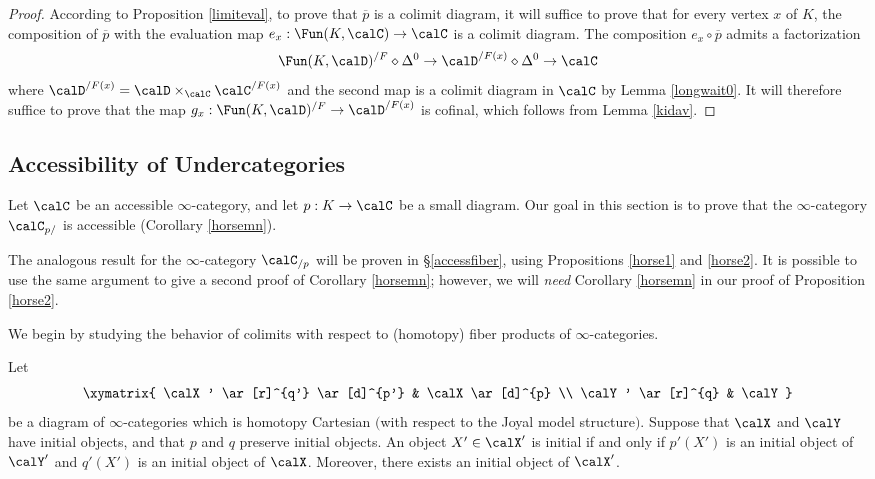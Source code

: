 \begin{proof}
According to Proposition \ref{limiteval}, to prove that $\overline{p}$ is a colimit diagram, it will suffice to prove that for every vertex $x$ of $K$, the composition of $\overline{p}$ with the evaluation
map $e_{x}: \Fun(K,\calC) \rightarrow \calC$ is a colimit diagram. The composition
$e_{x} \circ \overline{p}$ admits a factorization
$$ \Fun(K,\calD)^{/F} \diamond \Delta^0 \rightarrow \calD^{/F(x)} \diamond \Delta^0
\rightarrow \calC$$
where $\calD^{/F(x)} = \calD \times_{\calC} \calC^{/F(x)}$ and the second map is a colimit diagram in $\calC$ by Lemma \ref{longwait0}. It will therefore suffice to prove that the map
$g_x: \Fun(K,\calD)^{/F} \rightarrow \calD^{/F(x)}$ is cofinal, which follows from Lemma \ref{kidav}.
\end{proof}

\subsection{Accessibility of Undercategories}\label{accessprime}

Let $\calC$ be an accessible $\infty$-category, and let $p: K \rightarrow \calC$ be a small diagram. Our goal in this section is to prove that the $\infty$-category $\calC_{p/}$ is accessible (Corollary \ref{horsemn}). 

\begin{remark}
The analogous result for the $\infty$-category $\calC_{/p}$ will be proven in \S \ref{accessfiber}, using Propositions \ref{horse1} and \ref{horse2}. It is possible to use the same argument to give a second proof of Corollary \ref{horsemn}; however, we will {\em need} Corollary \ref{horsemn} in our proof of Proposition \ref{horse2}.
\end{remark}

We begin by studying the behavior of colimits with respect to (homotopy) fiber products of $\infty$-categories.

\begin{lemma}\label{bird1}
Let $$ \xymatrix{ \calX' \ar[r]^{q'} \ar[d]^{p'} & \calX \ar[d]^{p} \\
\calY' \ar[r]^{q} & \calY }$$
be a diagram of $\infty$-categories which is homotopy Cartesian $($with respect to the Joyal model structure$)$. Suppose that $\calX$ and $\calY$ have initial objects, and that $p$ and $q$ preserve initial objects. An object
$X' \in \calX'$ is initial if and only if $p'(X')$ is an initial object of $\calY'$ and
$q'(X')$ is an initial object of $\calX$. Moreover, there exists an initial object of $\calX'$.
\end{lemma}

